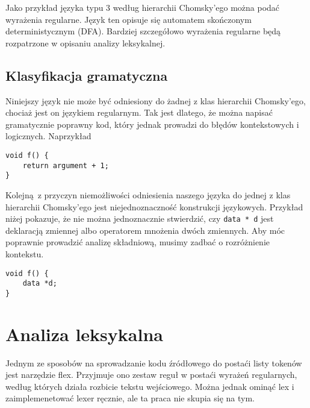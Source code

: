 \documentclass[leqno, 12pt]{article}
\newcommand{\spacing}{\vskip 0.5cm}
\begin{document}
			\spacing

			Jako przykład języka typu 3 według hierarchii Chomsky'ego można podać wyrażenia regularne. Język ten
			opisuje się automatem skończonym deterministycznym (DFA). Bardziej szczegółowo wyrażenia regularne będą
			rozpatrzone w opisaniu analizy leksykalnej.
			
		\subsection{Klasyfikacja gramatyczna}

			Niniejszy język nie może być odniesiony do żadnej z klas hierarchii Chomsky'ego, chociaż jest on
			językiem regularnym. Tak jest dlatego, że można napisać gramatycznie poprawny kod, który jednak prowadzi
			do błędów kontekstowych i logicznych. Naprzykład 
			
			\spacing
			
\begin{lstlisting}[caption={}, label={lst:ambigous-production}]
void f() {
	return argument + 1;
}
\end{lstlisting}

			\spacing
			
			Kolejną z przyczyn niemożliwości odniesienia naszego języka do jednej z klas hierarchii Chomsky'ego
			jest niejednoznaczność konstrukcji językowych. Przykład niżej pokazuje, że nie można jednoznacznie
			stwierdzić, czy \texttt{data * d} jest deklaracją zmiennej albo operatorem mnożenia dwóch zmiennych.
			Aby móc poprawnie prowadzić analizę składniową, musimy zadbać o rozróżnienie kontekstu.

			\spacing
			
\begin{lstlisting}[caption={}, label={lst:ambigous-production}]
void f() {
	data *d;
}
\end{lstlisting}

			\newpage

	\section{Analiza leksykalna}

		Jednym ze sposobów na sprowadzanie kodu źródłowego do postaći listy tokenów jest narzędzie flex.
		Przyjmuje ono zestaw reguł w postaći wyrażeń regularnych, według których
		działa rozbicie tekstu wejściowego. Można jednak ominąć lex i zaimplemenetować lexer ręcznie, ale
		ta praca nie skupia się na tym.
\end{document}
